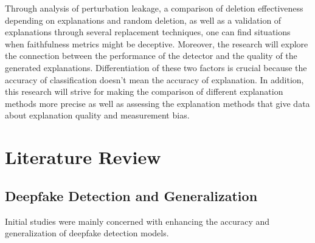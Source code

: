 \documentclass[12pt,a4wide]{report}
\theoremstyle{plain}
\theoremstyle{definition}
\theoremstyle{remark}
\begin{document}
Through analysis of perturbation leakage, a comparison of deletion effectiveness depending on explanations and random deletion, as well as a validation of explanations through several replacement techniques, one can find situations when faithfulness metrics might be deceptive.
Moreover, the research will explore the connection between the performance of the detector and the quality of the generated explanations. Differentiation of these two factors is crucial because the accuracy of classification doesn’t mean the accuracy of explanation.
In addition, this research will strive for making the comparison of different explanation methods more precise as well as assessing the explanation methods that give data about explanation quality and measurement bias.






\chapter{Literature Review}
\label{ch:literature}

\section{ Deepfake Detection and Generalization}
\label{sec:generators}

Initial studies were mainly concerned with enhancing the accuracy and generalization of deepfake detection models.
\end{document}
